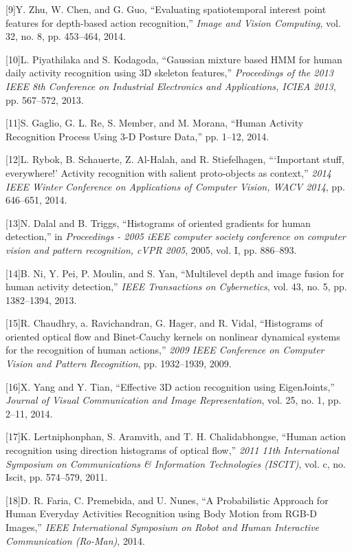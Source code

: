 {[}9{]}Y. Zhu, W. Chen, and G. Guo, ``Evaluating spatiotemporal interest
point features for depth-based action recognition,'' \emph{Image and
Vision Computing}, vol. 32, no. 8, pp. 453--464, 2014.

{[}10{]}L. Piyathilaka and S. Kodagoda, ``Gaussian mixture based HMM for
human daily activity recognition using 3D skeleton features,''
\emph{Proceedings of the 2013 IEEE 8th Conference on Industrial
Electronics and Applications, ICIEA 2013}, pp. 567--572, 2013.

{[}11{]}S. Gaglio, G. L. Re, S. Member, and M. Morana, ``Human Activity
Recognition Process Using 3-D Posture Data,'' pp. 1--12, 2014.

{[}12{]}L. Rybok, B. Schauerte, Z. Al-Halah, and R. Stiefelhagen,
```Important stuff, everywhere!' Activity recognition with salient
proto-objects as context,'' \emph{2014 IEEE Winter Conference on
Applications of Computer Vision, WACV 2014}, pp. 646--651, 2014.

{[}13{]}N. Dalal and B. Triggs, ``Histograms of oriented gradients for
human detection,'' in \emph{Proceedings - 2005 iEEE computer society
conference on computer vision and pattern recognition, cVPR 2005}, 2005,
vol. I, pp. 886--893.

{[}14{]}B. Ni, Y. Pei, P. Moulin, and S. Yan, ``Multilevel depth and
image fusion for human activity detection,'' \emph{IEEE Transactions on
Cybernetics}, vol. 43, no. 5, pp. 1382--1394, 2013.

{[}15{]}R. Chaudhry, a. Ravichandran, G. Hager, and R. Vidal,
``Histograms of oriented optical flow and Binet-Cauchy kernels on
nonlinear dynamical systems for the recognition of human actions,''
\emph{2009 IEEE Conference on Computer Vision and Pattern Recognition},
pp. 1932--1939, 2009.

{[}16{]}X. Yang and Y. Tian, ``Effective 3D action recognition using
EigenJoints,'' \emph{Journal of Visual Communication and Image
Representation}, vol. 25, no. 1, pp. 2--11, 2014.

{[}17{]}K. Lertniphonphan, S. Aramvith, and T. H. Chalidabhongse,
``Human action recognition using direction histograms of optical flow,''
\emph{2011 11th International Symposium on Communications \& Information
Technologies (ISCIT)}, vol. c, no. Iscit, pp. 574--579, 2011.

{[}18{]}D. R. Faria, C. Premebida, and U. Nunes, ``A Probabilistic
Approach for Human Everyday Activities Recognition using Body Motion
from RGB-D Images,'' \emph{IEEE International Symposium on Robot and
Human Interactive Communication (Ro-Man)}, 2014.

